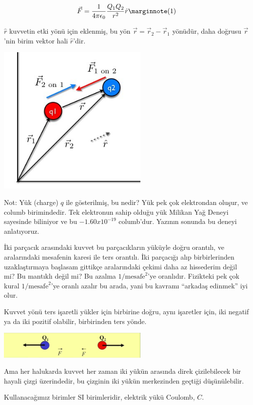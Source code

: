 \documentclass[12pt,fleqn]{article}\usepackage{../../common}
\begin{document}
$$ 
\vec{F}  = \frac{1}{4\pi \epsilon_0} \frac{Q_1Q_2}{r^2} \hat{r} 
\mlabel{1}
$$

$\hat{r}$ kuvvetin etki yönü için eklenmiş, bu yön
$\vec{r} = \vec{r}_2 - \vec{r}_1$ yönüdür, daha doğrusu $\vec{r}$'nin birim
vektor hali $\hat{r}$'dir.

\includegraphics[width=20em]{elecmag_05.jpg}

Not: Yük (charge) $q$ ile gösterilmiş, bu nedir?  Yük pek çok elektrondan
oluşur, ve columb birimindedir.  Tek elektronun sahip olduğu yük Milikan
Yağ Deneyi sayesinde biliniyor ve bu $-1.60 x 10^{-19}$ columb'dur. Yazının
sonunda bu deneyi anlatıyoruz.

İki parçacık arasındaki kuvvet bu parçacıkların yüküyle doğru orantılı, ve
aralarındaki mesafenin karesi ile ters orantılı. İki parçacığı alıp
birbirlerinden uzaklaştırmaya başlasam gittikçe aralarındaki çekimi daha az
hissederim değil mi? Bu mantıklı değil mi? Bu azalma
$1/\textrm{mesafe}^2$'ye oranlıdır. Fizikteki pek çok kural
$1/\textrm{mesafe}^2$'ye oranlı azalır bu arada, yani bu kavramı ``arkadaş
edinmek'' iyi olur.

Kuvvet yönü ters işaretli yükler için birbirine doğru, aynı işaretler için,
iki negatif ya da iki pozitif olabilir, birbirinden ters yönde.

\includegraphics[width=20em]{elecmag_03.png}

Ama her halukarda kuvvet her zaman iki yükün arasında direk çizilebilecek
bir hayali çizgi üzerindedir, bu çizginin iki yükün merkezinden geçtiği
düşünülebilir.

Kullanacağımız birimler SI birimleridir, elektrik yükü Coulomb, $C$.
\end{document}
